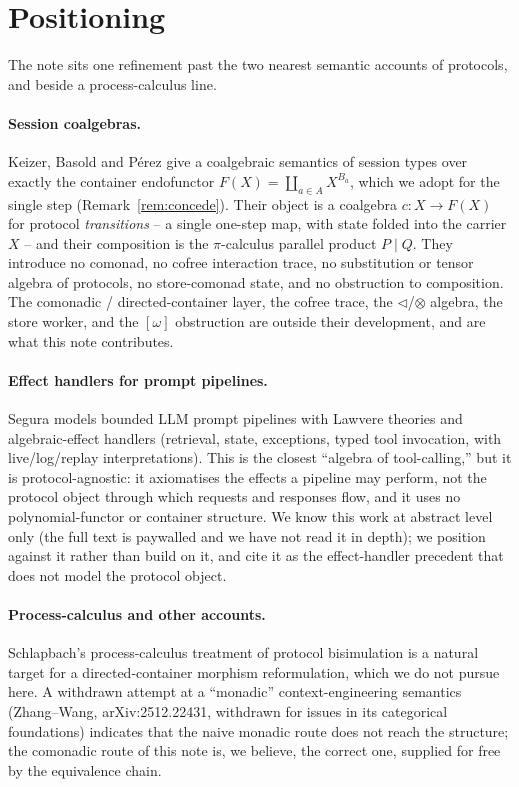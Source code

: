 \documentclass[11pt]{amsart}
\newcommand{\comp}{\mathbin{\triangleleft}}       %
\theoremstyle{plain}
\theoremstyle{definition}
\theoremstyle{remark}
\begin{document}
\section{Positioning}\label{sec:related}

The note sits one refinement past the two nearest semantic accounts of protocols, and beside a
process-calculus line.

\paragraph{Session coalgebras.}
Keizer, Basold and P\'erez \cite{sessioncoalg} give a coalgebraic semantics of session types over
exactly the container endofunctor $F(X)=\coprod_{a\in A}X^{B_a}$, which we adopt for the single step
(Remark~\ref{rem:concede}). Their object is a coalgebra $c:X\to F(X)$ for protocol \emph{transitions}
-- a single one-step map, with state folded into the carrier $X$ -- and their composition is the
$\pi$-calculus parallel product $P\mid Q$. They introduce no comonad, no cofree interaction trace, no
substitution or tensor algebra of protocols, no store-comonad state, and no obstruction to
composition. The comonadic / directed-container layer, the cofree trace, the $\comp$/$\otimes$
algebra, the store worker, and the $[\omega]$ obstruction are outside their development, and are what
this note contributes.

\paragraph{Effect handlers for prompt pipelines.}
Segura \cite{segura} models bounded LLM prompt pipelines with Lawvere theories and algebraic-effect
handlers (retrieval, state, exceptions, typed tool invocation, with live/log/replay interpretations).
This is the closest ``algebra of tool-calling,'' but it is protocol-agnostic: it axiomatises the
effects a pipeline may perform, not the protocol object through which requests and responses flow,
and it uses no polynomial-functor or container structure. We know this work at abstract level only
(the full text is paywalled and we have not read it in depth); we position against it rather than
build on it, and cite it as the effect-handler precedent that does not model the protocol object.

\paragraph{Process-calculus and other accounts.}
Schlapbach's process-calculus treatment of protocol bisimulation is a natural target for a
directed-container morphism reformulation, which we do not pursue here. A withdrawn attempt at a
``monadic'' context-engineering semantics (Zhang--Wang, arXiv:2512.22431, withdrawn for issues in its
categorical foundations) indicates that the naive monadic route does not reach the structure; the
comonadic route of this note is, we believe, the correct one, supplied for free by the equivalence
chain.
\end{document}
